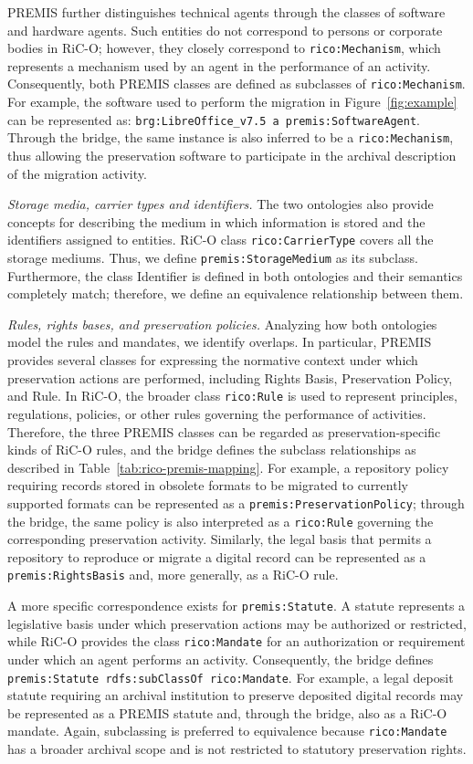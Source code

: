 \documentclass[runningheads]{llncs}
\begin{document}
PREMIS further distinguishes technical agents through the classes of software and hardware agents. Such
entities do not correspond to persons or corporate bodies in RiC-O; however,
they closely correspond to \texttt{rico:Mechanism}, which represents a
mechanism used by an agent in the performance of an activity. Consequently, both
PREMIS classes are defined as subclasses of \texttt{rico:Mechanism}. For
example, the software used to perform the migration in Figure~\ref{fig:example}
can be represented as: \texttt{brg:LibreOffice\_v7.5 a premis:SoftwareAgent}.
%
Through the bridge, the same instance is also inferred to be a
\texttt{rico:Mechanism}, thus allowing the preservation software to participate
in the archival description of the migration activity.

\emph{Storage media, carrier types and identifiers.}
The two ontologies also provide concepts for describing the medium in which
information is stored and the identifiers assigned to entities. RiC-O class \texttt{rico:CarrierType} covers all the storage mediums. Thus, we define \texttt{premis:StorageMedium} as its subclass. Furthermore, the class Identifier is defined in both ontologies and their semantics completely match; therefore, we define an equivalence relationship between them.


\emph{Rules, rights bases, and preservation policies.} Analyzing how both ontologies model the rules and mandates, we identify overlaps. In particular, PREMIS provides several classes for expressing the
normative context under which preservation actions are performed, including
Rights Basis, Preservation Policy, and Rule. In RiC-O, the broader class \texttt{rico:Rule} is used
to represent principles, regulations, policies, or other rules governing the
performance of activities. Therefore, the three PREMIS classes can be regarded as
preservation-specific kinds of RiC-O rules, and the bridge defines the subclass relationships as described in Table~\ref{tab:rico-premis-mapping}.
%
For example, a repository policy requiring records stored in obsolete formats
to be migrated to currently supported formats can be represented as a
\texttt{premis:PreservationPolicy}; through the bridge, the same policy is also
interpreted as a \texttt{rico:Rule} governing the corresponding preservation
activity. Similarly, the legal basis that permits a repository to reproduce or
migrate a digital record can be represented as a
\texttt{premis:RightsBasis} and, more generally, as a RiC-O rule.

A more specific correspondence exists for \texttt{premis:Statute}. A statute
represents a legislative basis under which preservation actions may be
authorized or restricted, while RiC-O provides the class
\texttt{rico:Mandate} for an authorization or requirement under which an agent
performs an activity. Consequently, the bridge defines
\texttt{premis:Statute rdfs:subClassOf rico:Mandate}. For example, a legal
deposit statute requiring an archival institution to preserve deposited digital
records may be represented as a PREMIS statute and, through the bridge, also as
a RiC-O mandate. Again, subclassing is preferred to equivalence because
\texttt{rico:Mandate} has a broader archival scope and is not restricted to
statutory preservation rights.
\end{document}
